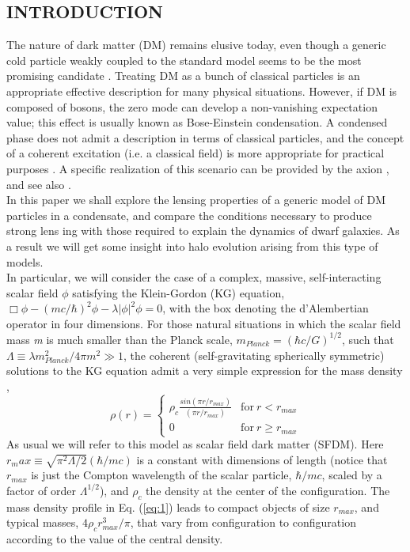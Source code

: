 \documentclass[10pt, letterpaper]{article}
\begin{document}
	\begin{multicols}{2}
		\section{\centering\small\selectfont INTRODUCTION}
		The nature of dark matter (DM)   remains elusive today, even though a generic cold particle weakly coupled to the standard model seems to be the most promising candidate \cite{Bertone_2005}. Treating DM as a bunch of classical particles is an appropriate effective description for many physical situations. However, if DM is composed of bosons, the zero mode can develop a non-vanishing expectation value; this effect is usually known as Bose-Einstein condensation. A condensed phase does not admit a description in terms of classical particles, and the concept of a coherent excitation (i.e. a classical field) is more appropriate for practical purposes \cite{PhysRevD.28.1243}. A specific realization of this scenario can be provided by the axion \cite{Kling_2008}, and see also \cite{Park_2003}. \\
		In this paper we shall explore the lensing properties of a generic model of DM particles in a condensate, and 	compare the conditions necessary to produce strong lens ing with those required to explain the dynamics of dwarf galaxies. As a result we will get some insight into halo evolution arising from this type of models. \\
		In particular, we will consider the case of a complex, massive, self-interacting scalar field $\phi$ satisfying the Klein-Gordon (KG) equation, $\Box \phi - (mc/\hbar)^2\phi-\lambda|\phi|^2\phi=0$, with the box denoting the d’Alembertian operator in four dimensions. For those natural situations in which the scalar field mass \textit{m} is much smaller than the Planck scale, $m_{Planck}=(\hbar c/G)^{1/2}$, such that $\Lambda \equiv \lambda m_{Planck}^2/4\pi m^2 \gg 1$, the coherent (self-gravitating spherically symmetric) solutions to the KG equation admit a very simple expression for the mass density \cite{PhysRevD.28.1243},
			\begin{equation} \label{eq:1}
				\rho(r) = \left\{
				\begin{array}{ll}
					\rho_c \frac{sin(\pi r/r_{max})}{(\pi r/r_{max})}      & \mathrm{for\ } r < r_{max} \\
					0     & \mathrm{for\ } r \geq r_{max}
				\end{array}
				\right.
			\end{equation}
		As usual we will refer to this model as scalar field dark matter (SFDM). Here $r_max \equiv\sqrt{\pi^2\Lambda/2}(\hbar/mc)$  is a constant with dimensions of length (notice that $r_{max}$ is just the Compton wavelength of the scalar particle, $\hbar/mc$, scaled by a factor of order $\Lambda^{1/2}$), and $\rho_c$ the density at the center of the configuration. The mass density profile in Eq. (\ref{eq:1})  leads to compact objects of size $r_{max}$, and typical masses, $4\rho_cr_{max}^3/\pi$, that vary from configuration to configuration according to the value of the central density. \par

\end{multicols}
\end{document}
